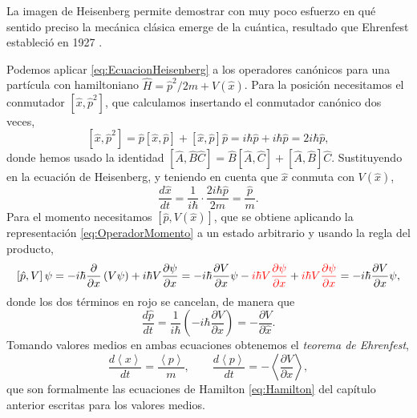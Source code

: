         La imagen de Heisenberg permite demostrar con muy poco esfuerzo en qué sentido preciso la mecánica clásica emerge de la cuántica, resultado que Ehrenfest estableció en 1927 \citep{ehrenfest1927bemerkung}.

        Podemos aplicar \eqref{eq:EcuacionHeisenberg} a los operadores canónicos para una partícula con hamiltoniano $\hat{H} = \hat{p}^{2}/2m + V(\hat{x})$. Para la posición necesitamos el conmutador $[\hat{x},\hat{p}^{2}]$, que calculamos insertando el conmutador canónico dos veces,
        \begin{equation}\label{eq:ConmutadorXP2}
            \left[\hat{x},\hat{p}^{2}\right] = \hat{p}\left[\hat{x},\hat{p}\right] + \left[\hat{x},\hat{p}\right]\hat{p} = i\hbar\hat{p} + i\hbar\hat{p} = 2i\hbar\hat{p},
        \end{equation}
        donde hemos usado la identidad $[\hat{A},\hat{B}\hat{C}] = \hat{B}[\hat{A},\hat{C}] + [\hat{A},\hat{B}]\hat{C}$. Sustituyendo en la ecuación de Heisenberg, y teniendo en cuenta que $\hat{x}$ conmuta con $V(\hat{x})$,
        \begin{equation}\label{eq:EhrenfestX}
            \frac{d\hat{x}}{dt} = \frac{1}{i\hbar}\cdot\frac{2i\hbar\hat{p}}{2m} = \frac{\hat{p}}{m} .
        \end{equation}
        Para el momento necesitamos $[\hat{p},V(\hat{x})]$, que se obtiene aplicando la representación \eqref{eq:OperadorMomento} a un estado arbitrario y usando la regla del producto,
        \begin{equation}\label{eq:ConmutadorPV}
            \left[\hat{p},V\right]\psi = -i\hbar\frac{\partial}{\partial x}\left(V\psi\right) + i\hbar V\frac{\partial\psi}{\partial x}
            = -i\hbar\frac{\partial V}{\partial x}\psi - \textcolor{red}{i\hbar V\frac{\partial\psi}{\partial x}} + \textcolor{red}{i\hbar V\frac{\partial\psi}{\partial x}}
            = -i\hbar\frac{\partial V}{\partial x}\psi,
        \end{equation}
        donde los dos términos en rojo se cancelan, de manera que
        \begin{equation}\label{eq:EhrenfestP}
            \frac{d\hat{p}}{dt} = \frac{1}{i\hbar}\left(-i\hbar\frac{\partial V}{\partial x}\right) = -\frac{\partial V}{\partial \hat{x}} .
        \end{equation}
        Tomando valores medios en ambas ecuaciones obtenemos el \textit{teorema de Ehrenfest},
        \begin{equation}\label{eq:Ehrenfest}
            \frac{d\left\langle x\right\rangle}{dt} = \frac{\left\langle p\right\rangle}{m},
            \qquad
            \frac{d\left\langle p\right\rangle}{dt} = -\left\langle\frac{\partial V}{\partial x}\right\rangle,
        \end{equation}
        que son formalmente las ecuaciones de Hamilton \eqref{eq:Hamilton} del capítulo anterior escritas para los valores medios.

